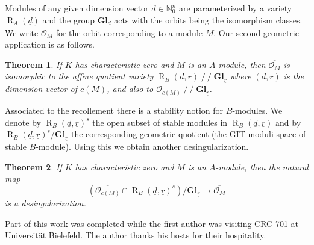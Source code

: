 \documentclass[11pt,a4paper]{amsart}
\theoremstyle{plain}
\newtheorem{thm}{Theorem}[section]
\theoremstyle{definition}
\begin{document}
Modules of any given dimension vector ${\underline{d}}\in {\mathbb{N}}_0^n$ are parameterized by a variety ${\operatorname{R}_A(\underline{d})}$
and the group ${\mathbf{Gl}_{\underline{d }}}$ acts with the orbits being the isomorphism classes. 
We write ${\mathcal{O}_M}$ for the orbit corresponding to a module $M$.
Our second geometric application is as follows.

\begin{thm}
If $K$ has characteristic zero and $M$ is an $A$-module, then
$\overline{\mathcal{O}_M}$ is isomorphic to the affine quotient variety
${\operatorname{R}_B(\underline{d},\underline{r})}\operatorname{/\!\!/}{\mathbf{Gl}_{\underline{r}}}$ where $({\underline{d}},{\underline{r}})$ is the dimension vector of $c(M)$,
and also to $\overline{{\mathcal{O}}_{c(M)}} \operatorname{/\!\!/} {\mathbf{Gl}_{\underline{r}}}$.
\end{thm}

Associated to the recollement there is a stability notion for $B$-modules.
We denote by ${\operatorname{R}_B(\underline{d},\underline{r})}^s$ the open subset of stable modules in ${\operatorname{R}_B(\underline{d},\underline{r})}$
and by ${\operatorname{R}_B(\underline{d},\underline{r})}^s / {\mathbf{Gl}_{\underline{r}}}$ the corresponding geometric quotient (the GIT
moduli space of stable $B$-module). 
Using this we obtain another desingularization.

\begin{thm}
If $K$ has characteristic zero and $M$ is an $A$-module, then
the natural map 
\[\left( \overline{{\mathcal{O}}_{c(M)}} \cap {\operatorname{R}_B(\underline{d},\underline{r})}^s\right)/ {\mathbf{Gl}_{\underline{r}}} \to \overline{{\mathcal{O}}_M}
\]
is a desingularization.
\end{thm}

Part of this work was completed while the first author was visiting CRC 701 at Universit\"at Bielefeld. The author thanks his hosts for their hospitality.
\end{document}
